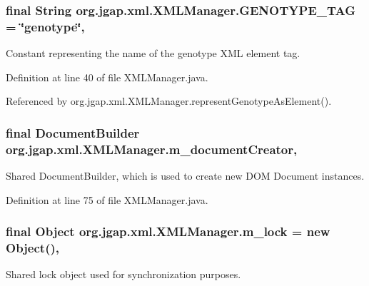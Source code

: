 \hypertarget{classorg_1_1jgap_1_1xml_1_1_x_m_l_manager_a161a14a8472a0da0f73dca084d99100e}{
\subsubsection[{G\-E\-N\-O\-T\-Y\-P\-E\-\_\-\-T\-A\-G}]{\setlength{\rightskip}{0pt plus 5cm}final String org.\-jgap.\-xml.\-X\-M\-L\-Manager.\-G\-E\-N\-O\-T\-Y\-P\-E\-\_\-\-T\-A\-G = \char`\"{}genotype\char`\"{}\hspace{0.3cm}{\ttfamily [static]}, {\ttfamily [private]}}}\label{classorg_1_1jgap_1_1xml_1_1_x_m_l_manager_a161a14a8472a0da0f73dca084d99100e}
Constant representing the name of the genotype X\-M\-L element tag. 

Definition at line 40 of file X\-M\-L\-Manager.\-java.



Referenced by org.\-jgap.\-xml.\-X\-M\-L\-Manager.\-represent\-Genotype\-As\-Element().

\hypertarget{classorg_1_1jgap_1_1xml_1_1_x_m_l_manager_a244be2fb6db3b4d0763d73c7ff42d675}{
\subsubsection[{m\-\_\-document\-Creator}]{\setlength{\rightskip}{0pt plus 5cm}final Document\-Builder org.\-jgap.\-xml.\-X\-M\-L\-Manager.\-m\-\_\-document\-Creator\hspace{0.3cm}{\ttfamily [static]}, {\ttfamily [private]}}}\label{classorg_1_1jgap_1_1xml_1_1_x_m_l_manager_a244be2fb6db3b4d0763d73c7ff42d675}
Shared Document\-Builder, which is used to create new D\-O\-M Document instances. 

Definition at line 75 of file X\-M\-L\-Manager.\-java.

\hypertarget{classorg_1_1jgap_1_1xml_1_1_x_m_l_manager_a29ebbee4381287f18885e3d89f17221d}{
\subsubsection[{m\-\_\-lock}]{\setlength{\rightskip}{0pt plus 5cm}final Object org.\-jgap.\-xml.\-X\-M\-L\-Manager.\-m\-\_\-lock = new Object()\hspace{0.3cm}{\ttfamily [static]}, {\ttfamily [private]}}}\label{classorg_1_1jgap_1_1xml_1_1_x_m_l_manager_a29ebbee4381287f18885e3d89f17221d}
Shared lock object used for synchronization purposes. 

